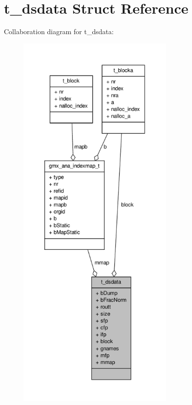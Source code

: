 \hypertarget{structt__dsdata}{\section{t\-\_\-dsdata \-Struct \-Reference}
\label{structt__dsdata}
}


\-Collaboration diagram for t\-\_\-dsdata\-:
\nopagebreak
\begin{figure}[H]
\begin{center}
\leavevmode
\includegraphics[height=550pt]{structt__dsdata__coll__graph}
\end{center}
\end{figure}
